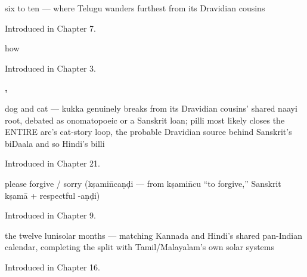 \noindent\begin{minipage}[t]{\linewidth}
\raggedright
\textbf{    }\par
\small six to ten — where Telugu wanders furthest from its Dravidian cousins\par
\footnotesize Introduced in Chapter 7.
\end{minipage}\par\medskip

\noindent\begin{minipage}[t]{\linewidth}
\raggedright
\textbf{}\par
\small how\par
\footnotesize Introduced in Chapter 3.
\end{minipage}\par\medskip

\noindent\begin{minipage}[t]{\linewidth}
\raggedright
\textbf{, }\par
\small dog and cat — kukka genuinely breaks from its Dravidian cousins' shared naayi root, debated as onomatopoeic or a Sanskrit loan; pilli most likely closes the ENTIRE arc's cat-story loop, the probable Dravidian source behind Sanskrit's biDaala and so Hindi's billi\par
\footnotesize Introduced in Chapter 21.
\end{minipage}\par\medskip

\noindent\begin{minipage}[t]{\linewidth}
\raggedright
\textbf{}\par
\small please forgive / sorry (kṣamin̄caṇḍi — from kṣamin̄cu \textquotedblleft{}to forgive,\textquotedblright{} Sanskrit kṣamā + respectful -aṇḍi)\par
\footnotesize Introduced in Chapter 9.
\end{minipage}\par\medskip

\noindent\begin{minipage}[t]{\linewidth}
\raggedright
\textbf{           }\par
\small the twelve lunisolar months — matching Kannada and Hindi's shared pan-Indian calendar, completing the split with Tamil/Malayalam's own solar systems\par
\footnotesize Introduced in Chapter 16.
\end{minipage}\par\medskip

